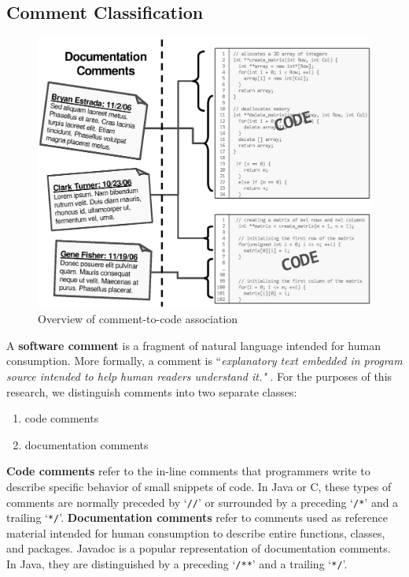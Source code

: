 \subsection{Comment Classification}

\begin{figure}
\begin{narrow}{-1.5in}{-1.5in}
\begin{center}
\includegraphics[scale=0.75]{images/comments.eps}
\end{center}
\end{narrow}
\caption{Overview of comment-to-code association}
\label{comment_to_code}
\end{figure}

A \textbf{software comment} is a fragment of natural language intended for human
consumption. More formally, a comment is ``\textit{explanatory text embedded in
program source intended to help human readers understand it."} \cite{FOLDOC}.
For the purposes of this research, we distinguish comments into two separate 
classes: 
\begin{enumerate}
  \item code comments
  \item documentation comments
\end{enumerate}

\textbf{Code comments} refer to the in-line comments that programmers write to
describe specific behavior of small snippets of code. In Java or C, these types
of comments are normally preceded by `\verb!//!' or surrounded by a preceding 
`\verb!/*!' and a trailing `\verb!*/!'. \textbf{Documentation comments} refer to
comments used as reference material intended for human consumption to describe 
entire functions, classes, and packages. Javadoc \cite{Javadoc} is a popular
representation of documentation comments. In Java, they are distinguished by a
preceding `\verb!/**!' and a trailing `\verb!*/!'.

